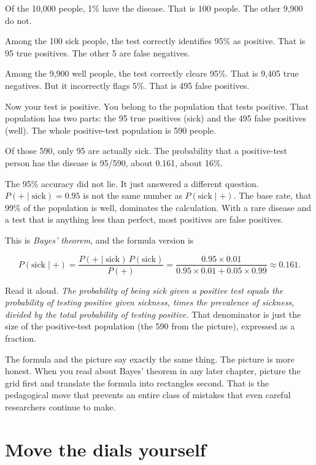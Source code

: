 \documentclass[
  letterpaper,
  11pt,
  twoside,
  openany]{scrbook}
\begin{document}
Of the 10,000 people, 1\% have the disease. That is 100 people. The
other 9,900 do not.

Among the 100 sick people, the test correctly identifies 95\% as
positive. That is 95 true positives. The other 5 are false negatives.

Among the 9,900 well people, the test correctly clears 95\%. That is
9,405 true negatives. But it incorrectly flags 5\%. That is 495 false
positives.

Now your test is positive. You belong to the population that tests
positive. That population has two parts: the 95 true positives (sick)
and the 495 false positives (well). The whole positive-test population
is 590 people.

Of those 590, only 95 are actually sick. The probability that a
positive-test person has the disease is 95/590, about 0.161, about 16\%.

The 95\% accuracy did not lie. It just answered a different question.
\(P(+ \mid \text{sick}) = 0.95\) is not the same number as
\(P(\text{sick} \mid +)\). The base rate, that 99\% of the population is
well, dominates the calculation. With a rare disease and a test that is
anything less than perfect, most positives are false positives.

This is \emph{Bayes' theorem}, and the formula version is

\[
P(\text{sick} \mid +) = \frac{P(+ \mid \text{sick}) \, P(\text{sick})}{P(+)} = \frac{0.95 \times 0.01}{0.95 \times 0.01 + 0.05 \times 0.99} \approx 0.161.
\]

Read it aloud. \emph{The probability of being sick given a positive test
equals the probability of testing positive given sickness, times the
prevalence of sickness, divided by the total probability of testing
positive.} That denominator is just the size of the positive-test
population (the 590 from the picture), expressed as a fraction.

The formula and the picture say exactly the same thing. The picture is
more honest. When you read about Bayes' theorem in any later chapter,
picture the grid first and translate the formula into rectangles second.
That is the pedagogical move that prevents an entire class of mistakes
that even careful researchers continue to make.

\section{Move the dials yourself}\label{move-the-dials-yourself}
\end{document}
